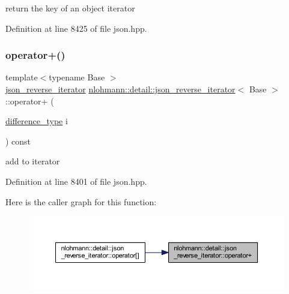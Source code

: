 return the key of an object iterator 



Definition at line 8425 of file json.\+hpp.

\mbox{\label{classnlohmann_1_1detail_1_1json__reverse__iterator_aabf172b436988e2edde22f13f27caaed}} 
\subsubsection{\texorpdfstring{operator+()}{operator+()}}
{\footnotesize\ttfamily template$<$typename Base $>$ \\
\mbox{\hyperlink{classnlohmann_1_1detail_1_1json__reverse__iterator}{json\+\_\+reverse\+\_\+iterator}} \mbox{\hyperlink{classnlohmann_1_1detail_1_1json__reverse__iterator}{nlohmann\+::detail\+::json\+\_\+reverse\+\_\+iterator}}$<$ Base $>$\+::operator+ (\begin{DoxyParamCaption}\item[{\mbox{\hyperlink{classnlohmann_1_1detail_1_1json__reverse__iterator_a9ab55987c05ec6427ad36082e351cc45}{difference\+\_\+type}}}]{i }\end{DoxyParamCaption}) const\hspace{0.3cm}{\ttfamily [inline]}}



add to iterator 



Definition at line 8401 of file json.\+hpp.

Here is the caller graph for this function\+:
\nopagebreak
\begin{figure}[H]
\begin{center}
\leavevmode
\includegraphics[width=350pt]{classnlohmann_1_1detail_1_1json__reverse__iterator_aabf172b436988e2edde22f13f27caaed_icgraph}
\end{center}
\end{figure}
\mbox{\label{classnlohmann_1_1detail_1_1json__reverse__iterator_aada9d2b320002ef870c5283cda2c1e9d}} 
